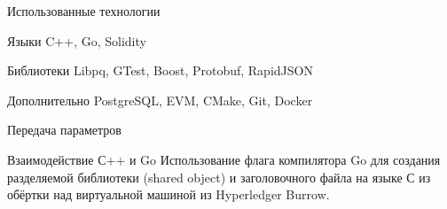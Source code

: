 \documentclass[hyperref={pdfpagelabels=false}]{beamer}
\begin{document}
\begin{frame}{Использованные технологии}
\begin{block}{Языки}
	C++, Go, Solidity
\end{block}
\vfill
\begin{block}{Библиотеки}
	Libpq, GTest, Boost, Protobuf, RapidJSON
\end{block}
\vfill
\begin{block}{Дополнительно}
	PostgreSQL, EVM, CMake, Git, Docker
\end{block}

\end{frame} 

\begin{frame}{Передача параметров}
\begin{block}{Взаимодействие С++ и Go}
Использование флага компилятора Go для создания разделяемой библиотеки (shared object) и заголовочного файла на языке С из обёртки над виртуальной машиной из Hyperledger Burrow.
\end{block} 
\end{frame}
\end{document}
